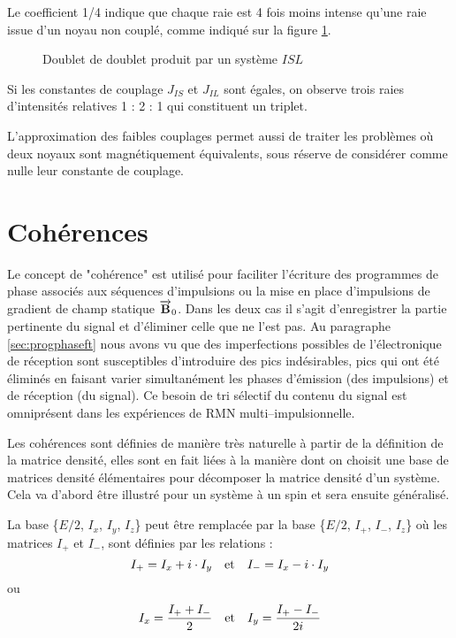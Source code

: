 Le coefficient 1/4 indique que chaque raie est 4 fois moins intense qu'une raie issue d'un 
noyau non couplé, comme indiqué sur la figure \ref{fig:ix-isl}.

\begin{figure}[hbt]
\begin{center}
\end{center}
\caption[Doublet de doublet produit par un système $ISL$]{
\label{fig:ix-isl}
Doublet de doublet produit par un système $ISL$}
\end{figure}

Si les constantes de couplage $J_{IS}$ et $J_{IL}$ sont égales,
on observe trois raies d'intensités 
relatives 1 : 2 : 1 qui constituent un triplet.

L'approximation des faibles couplages permet aussi de traiter les 
problèmes où deux noyaux sont magnétiquement équivalents, sous réserve de 
considérer comme nulle leur constante de couplage.

\section{Cohérences}

Le concept de "cohérence" est utilisé pour faciliter l'écriture des programmes
de phase associés aux séquences d'impulsions ou la mise en place
d'impulsions de gradient de champ statique $\overrightarrow{\mathbf{B}}_0$.
Dans les deux cas il s'agit d'enregistrer la partie pertinente du signal
et d'éliminer celle que ne l'est pas.
Au paragraphe \ref{sec:progphaseft} nous avons vu que des imperfections
possibles de l'électronique de réception sont susceptibles
d'introduire des pics indésirables, pics
qui ont été éliminés en faisant varier simultanément les phases
d'émission (des impulsions) et de réception (du signal).
Ce besoin de tri sélectif du contenu du signal
est omniprésent dans les expériences de RMN multi--impulsionnelle.

Les cohérences sont définies de manière très naturelle à
partir de la définition de la matrice densité,
elles sont en fait liées à la manière dont on choisit une base
de matrices densité élémentaires pour décomposer la
matrice densité d'un système.
Cela va d'abord être illustré pour un système à un spin
et sera ensuite généralisé.

La base \{$E/2$, $I_x$, $I_y$, $I_z$\} peut être remplacée par la
base \{$E/2$, $I_+$, $I_-$, $I_z$\} où les matrices $I_+$ et $I_-$, sont 
définies par les relations :
\begin{equation}
I_+ = I_x + i \cdot I_y \quad \mbox{et} \quad I_- = I_x - i \cdot I_y
\end{equation}
ou
\begin{equation}
I_x = \frac{I_+ + I_-}{2} \quad \mbox{et} \quad I_y = \frac{I_+ - I_-}{2i}
\end{equation}

